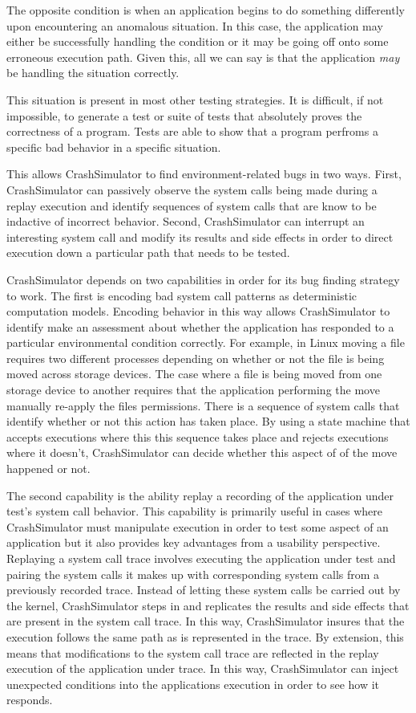 The opposite condition is when an application begins to do something differently upon encountering an anomalous
situation.  In this case, the application may either be successfully handling the condition or it may be going off onto
some erroneous execution path.  Given this, all we can say is that the application \emph{may} be handling the situation
correctly.

This situation is present in most other testing strategies. It is difficult, if not impossible, to generate a test or
suite of tests that absolutely proves the correctness of a program. Tests are able to show that a program perfroms a
specific bad behavior in a specific situation. 


This allows CrashSimulator to find environment-related bugs in two ways.  First, CrashSimulator can passively observe
the system calls being made during a replay execution and identify sequences of system calls that are know to be
indactive of incorrect behavior.  Second, CrashSimulator can interrupt an interesting system call and modify its results
and side effects in order to direct execution down a particular path that needs to be tested.

CrashSimulator depends on two capabilities in order for its bug finding strategy to work.  The first is encoding bad
system call patterns as deterministic computation models.  Encoding behavior in this way allows CrashSimulator to
identify make an assessment about whether the application has responded to a particular environmental condition
correctly.  For example, in Linux moving a file requires two different processes depending on whether or not the file is
being moved across storage devices.  The case where a file is being moved from one storage device to another requires
that the application performing the move manually re-apply the files permissions.  There is a sequence of system calls
that identify whether or not this action has taken place.  By using a state machine that accepts executions where this
this sequence takes place and rejects executions where it doesn't, CrashSimulator can decide whether this aspect of of
the move happened or not.

The second capability is the ability replay a recording of the application under test's system call behavior.  This
capability is primarily useful in cases where CrashSimulator must manipulate execution in order to test some aspect of
an application but it also provides key advantages from a usability perspective.  Replaying a system call trace involves
executing the application under test and pairing the system calls it makes up with corresponding system calls from a
previously recorded trace.  Instead of letting these system calls be carried out by the kernel, CrashSimulator steps in
and replicates the results and side effects that are present in the system call trace.  In this way, CrashSimulator
insures that the execution follows the same path as is represented in the trace.  By extension, this means that
modifications to the system call trace are reflected in the replay execution of the application under trace.  In this
way, CrashSimulator can inject unexpected conditions into the applications execution in order to see how it responds.
